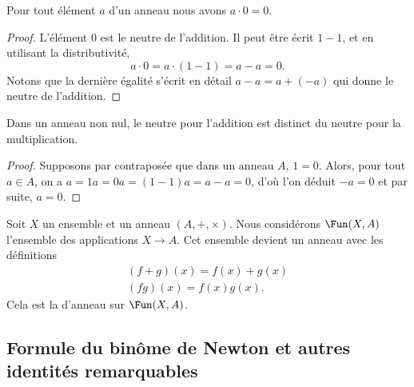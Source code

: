 \begin{lemma}       \label{LEMooVUSMooWisQpD}
    Pour tout élément \( a\) d'un anneau nous avons \( a\cdot 0=0\).
\end{lemma}

\begin{proof}
    L'élément \( 0\) est le neutre de l'addition. Il peut être écrit \( 1-1\), et en utilisant la distributivité,
    \begin{equation}
        a\cdot 0=a\cdot (1-1)=a-a=0.
    \end{equation}
    Notons que la dernière égalité s'écrit en détail \( a-a=a+(-a)\) qui donne le neutre de l'addition.
\end{proof}

\begin{proposition}     \label{PROPooNCCGooXjVyVt}
    Dans un anneau non nul, le neutre pour l'addition est distinct du neutre pour la multiplication.
\end{proposition}
\begin{proof}
    Supposons par contraposée que dans un anneau $A$, \( 1 = 0 \). Alors, pour tout \( a \in A \), on a \( a = 1a = 0a = (1 - 1)a = a - a=0 \), d'où l'on déduit \( -a = 0  \) et par suite, \( a = 0. \)
\end{proof}

\begin{normaltext}
Soit \( X\) un ensemble et un anneau $(A, +, \times)$. Nous considérons \( \Fun(X,A)\) l'ensemble des applications \( X\to A\). Cet ensemble devient un anneau avec les définitions
\begin{subequations}
    \begin{align}
        (f+g)(x)=f(x)+g(x)\\
        (fg)(x)=f(x)g(x).
    \end{align}
\end{subequations}
Cela est la  d'anneau sur \( \Fun(X,A)\).
\end{normaltext}

\subsection{Formule du binôme de Newton et autres identités remarquables}

